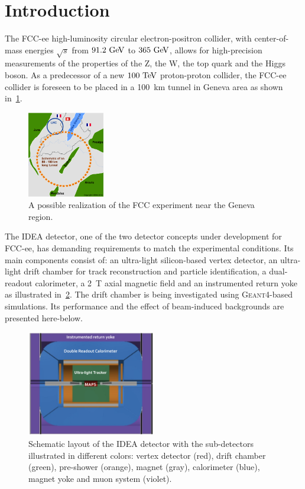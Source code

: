 \section{Introduction}
The FCC-ee high-luminosity circular electron-positron collider, with center-of-mass energies $\sqrt{s}$ from $91.2\,\mathrm{\,Ge\kern -0.1em V}$ to
$365\,\mathrm{\,Ge\kern -0.1em V}$, allows for high-precision measurements of the properties of the Z, the W, the top quark and the Higgs boson. As a predecessor of a new $100\,\mathrm{\,Te\kern -0.1em V}$ proton-proton collider, the FCC-ee collider is foreseen to be placed in a 100~km tunnel in Geneva area as shown in~\cref{fig_fcc_cern}.

\begin{figure}[ht]
	\centering
	\includegraphics[width=0.3\textwidth]{figures/cernFCC.jpg}%
	\caption{A possible realization of the FCC experiment near the Geneva region.}
	\label{fig_fcc_cern}
\end{figure}

The IDEA detector, one of the two detector concepts under development for FCC-ee, has demanding requirements to match the experimental conditions. Its main components consist of: an ultra-light silicon-based vertex detector, an ultra-light drift chamber for track reconstruction and particle identification, a dual-readout calorimeter, a 2~T axial magnetic field and an instrumented return yoke as illustrated in~\cref{fig_IDEA}. The drift chamber is being investigated using \textsc{Geant4}-based simulations. Its performance and the effect of beam-induced backgrounds are presented here-below.

\begin{figure}[ht]
	\centering
	\includegraphics[width=0.5\textwidth]{figures/FCCeeIDEAConcept}%
	\caption{Schematic layout of the IDEA detector with the sub-detectors illustrated in different colors: vertex detector (red), drift chamber (green), pre-shower (orange), magnet (gray), calorimeter (blue), magnet yoke and muon system (violet).}
	\label{fig_IDEA}
\end{figure}

